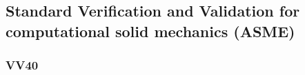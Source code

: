 \subsection{Standard Verification and Validation for computational solid mechanics (ASME)}
\subsubsection{VV40}


